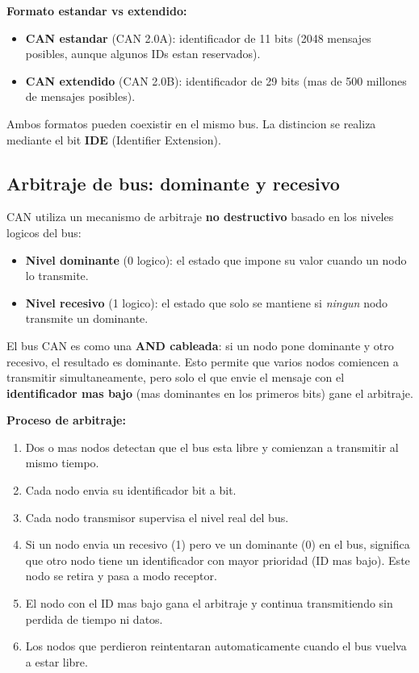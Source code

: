 \textbf{Formato estandar vs extendido:}

\begin{itemize}
    \item \textbf{CAN estandar} (CAN 2.0A): identificador de 11 bits (2048
    mensajes posibles, aunque algunos IDs estan reservados).
    \item \textbf{CAN extendido} (CAN 2.0B): identificador de 29 bits (mas de 500
    millones de mensajes posibles).
\end{itemize}

Ambos formatos pueden coexistir en el mismo bus. La distincion se realiza
mediante el bit \textbf{IDE} (Identifier Extension).

\subsection{Arbitraje de bus: dominante y recesivo}

CAN utiliza un mecanismo de arbitraje \textbf{no destructivo} basado en los
niveles logicos del bus:

\begin{itemize}
    \item \textbf{Nivel dominante} (0 logico): el estado que impone su valor
    cuando un nodo lo transmite.
    \item \textbf{Nivel recesivo} (1 logico): el estado que solo se mantiene si
    \textit{ningun} nodo transmite un dominante.
\end{itemize}

El bus CAN es como una \textbf{AND cableada}: si un nodo pone dominante y otro
recesivo, el resultado es dominante. Esto permite que varios nodos comiencen a
transmitir simultaneamente, pero solo el que envie el mensaje con el
\textbf{identificador mas bajo} (mas dominantes en los primeros bits) gane el
arbitraje.

\textbf{Proceso de arbitraje:}
\begin{enumerate}
    \item Dos o mas nodos detectan que el bus esta libre y comienzan a transmitir
    al mismo tiempo.
    \item Cada nodo envia su identificador bit a bit.
    \item Cada nodo transmisor supervisa el nivel real del bus.
    \item Si un nodo envia un recesivo (1) pero ve un dominante (0) en el bus,
    significa que otro nodo tiene un identificador con mayor prioridad (ID mas
    bajo). Este nodo se retira y pasa a modo receptor.
    \item El nodo con el ID mas bajo gana el arbitraje y continua transmitiendo
    sin perdida de tiempo ni datos.
    \item Los nodos que perdieron reintentaran automaticamente cuando el bus vuelva
    a estar libre.
\end{enumerate}

